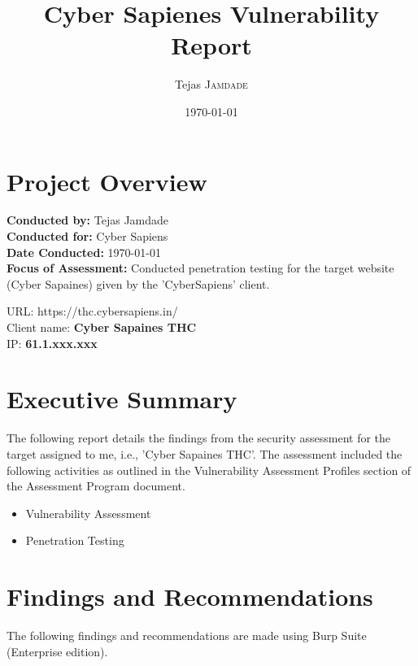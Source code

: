 \documentclass[12pt]{article}
\begin{document}
\title{Cyber Sapienes Vulnerability Report}%
\author{Tejas \textsc{Jamdade}}%
\date{\today}
\maketitle
\newpage
\tableofcontents
\newpage

\section{Project Overview}
\begin{flushleft}
\textbf{Conducted by: } Tejas Jamdade\\
\vspace{4mm}
\textbf{Conducted for: } Cyber Sapiens\\
\vspace{4mm}
\textbf{Date Conducted: } \today\\
\vspace{4mm}
\textbf{Focus of Assessment: } Conducted penetration testing for the target website (Cyber Sapaines) given by the 'CyberSapiens' client.
\end{flushleft}

\begin{tcolorbox}[title=Home Lab Client]
URL: https://thc.cybersapiens.in/\\
Client name: \textbf{Cyber Sapaines THC}\\ 
IP:  \textbf{61.1.xxx.xxx}
\end{tcolorbox}

\section{Executive Summary}
The following report details the findings from the security assessment for the target assigned to me, i.e., 'Cyber Sapaines THC'. The assessment included the following activities as outlined in the Vulnerability Assessment Profiles section of the Assessment Program document.

\begin{itemize}
	\item Vulnerability Assessment 
	\item	Penetration Testing
\end{itemize}

\section{Findings and Recommendations}
The following findings and recommendations are made using Burp Suite (Enterprise edition). \\






\newpage

%
\newpage

%
\end{document}
